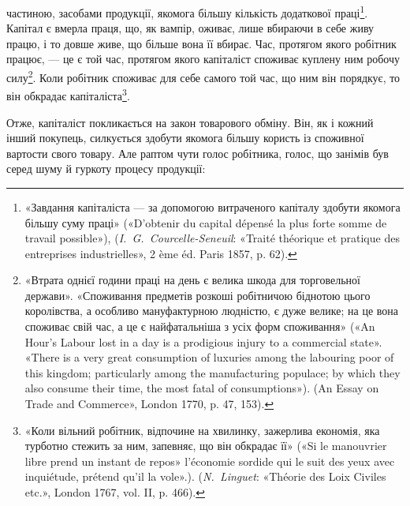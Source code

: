 \parcont{}  %
частиною, засобами продукції, якомога більшу кількість додаткової
праці\footnote{
«Завдання капіталіста — за допомогою витраченого капіталу здобути
якомога більшу суму праці» («D’obtenir du capital dépensé la
plus forte somme de travail possible»), (\emph{I.~G.~Courcelle-Seneuil}: «Traité
théorique et pratique des entreprises industrielles», 2 ème éd. Paris 1857,
p. 62).
}. Капітал є вмерла праця, що, як вампір, оживає,
лише вбираючи в себе живу працю, і то довше живе, що більше
вона її вбирає. Час, протягом якого робітник працює, — це є
той час, протягом якого капіталіст споживає куплену ним робочу
силу\footnote{
«Втрата однієї години праці на день є велика шкода для торговельної
держави». «Споживання предметів розкоші робітничою біднотою цього
королівства, а особливо мануфактурною людністю, є дуже велике; на це
вона споживає свій час, а це є найфатальніша з усіх форм споживання»
(«An Hour’s Labour lost in a day is a prodigious injury to a commercial
state». «There is a very great consumption of luxuries among the labouring
poor of this kingdom; particularly among the manufacturing populace; by
which they also consume their time, the most fatal of consumptions»). (An
Essay on Trade and Commerce», London 1770, p. 47, 153).
}. Коли робітник споживає для себе самого той час, що ним
він порядкує, то він обкрадає капіталіста\footnote{
«Коли вільний робітник, відпочине на хвилинку, зажерлива економія,
яка турботно стежить за ним, запевняє, що він обкрадає її» («Si le
manouvrier libre prend un instant de repos» l’économie sordide qui le suit
des yeux avec inquiétude, prétend qu’il la vole».). (\emph{N.~Linguet}: «Théorie
des Loix Civiles etc.», London 1767, vol. II, p. 466).
}.

Отже, капіталіст покликається на закон товарового обміну.
Він, як і кожний інший покупець, силкується здобути якомога
більшу користь із споживної вартости свого товару. Але раптом
чути голос робітника, голос, що занімів був серед шуму й гуркоту
процесу продукції:

